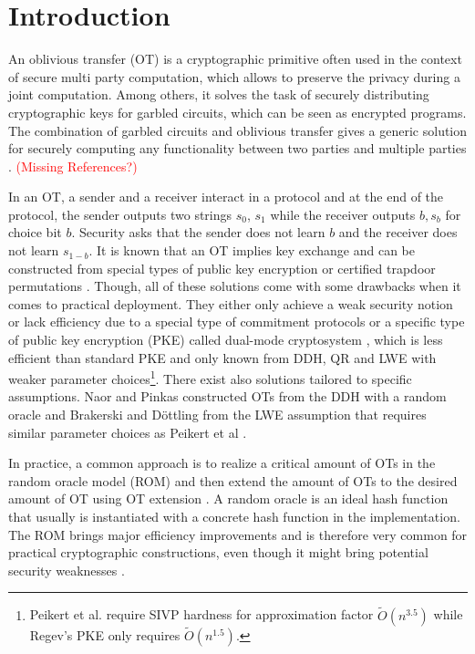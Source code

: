 \newcommand{\msng}{\textcolor{red}{(Missing References?)}}

\section{Introduction}

An oblivious transfer (OT) \cite{Rabin81,C:EveGolLem82} is a cryptographic primitive often used in the context of secure multi party computation, which allows to preserve the privacy during a joint computation. Among others, it solves the task of securely distributing cryptographic keys for garbled circuits, which can be seen as encrypted programs. The combination of garbled circuits and oblivious transfer gives a generic solution for securely computing any functionality between two parties \cite{FOCS:Yao82b,FOCS:Yao86,STOC:Kilian88,C:IshPraSah08} and multiple parties \cite{C:CreVanTap95,EC:BenLin18,EC:GarSri18a}. \msng  

In an OT, a sender and a receiver interact in a protocol and at the end of the protocol, the sender outputs two strings $s_0$, $s_1$ while the receiver outputs $b, s_b$ for choice bit $b$. Security asks that the sender does not learn $b$ and the receiver does not learn $s_{1-b}$. It is known that an OT implies key exchange and can be constructed from special types of public key encryption \cite{FOCS:GKMRV00,C:PeiVaiWat08,cryptoeprint:2018:473} or certified trapdoor permutations \cite{C:OstRicSca15}. Though, all of these solutions come with some drawbacks when it comes to practical deployment. They either only achieve a weak security notion \cite{FOCS:GKMRV00} or lack efficiency due to a special type of commitment protocols \cite{STOC:Kilian92,C:OstRicSca15,cryptoeprint:2018:473} or a specific type of public key encryption (PKE) called dual-mode cryptosystem \cite{C:PeiVaiWat08}, which is less efficient than standard PKE and only known from DDH, QR and LWE with weaker parameter choices\footnote{Peikert et al. require SIVP hardness for approximation factor $\tilde{O}(n^{3.5})$ while Regev's PKE \cite{STOC:Regev05} only requires $\tilde{O}(n^{1.5})$.}. There exist also solutions tailored to specific assumptions. Naor and Pinkas \cite{SODA:NaoPin01} constructed OTs from the DDH with a random oracle and Brakerski and D\"ottling \cite{TCC:BraDot18} from the LWE assumption that requires similar parameter choices as Peikert et al \cite{C:PeiVaiWat08}.

In practice, a common approach is to realize a critical amount of OTs in the random oracle model (ROM) \cite{CCS:BelRog93,SODA:NaoPin01} and then extend the amount of OTs to the desired amount of OT using OT extension \cite{STOC:Beaver96a,C:IKNP03,RSA:OrrOrsSch17,EC:ALSZ15,C:KelOrsSch15}. A random oracle is an ideal hash function that usually is instantiated with a concrete hash function in the implementation. The ROM brings major efficiency improvements and is therefore very common for practical cryptographic constructions, even though it might bring potential security weaknesses \cite{STOC:CanGolHal98}. 

